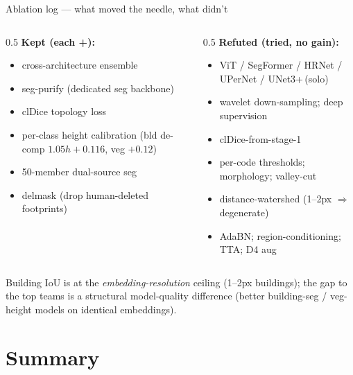 \documentclass[aspectratio=169,11pt]{beamer}
\begin{document}
\begin{frame}{Ablation log --- what moved the needle, what didn't}
  \begin{columns}[T]
    \begin{column}{0.5\textwidth}
      \textcolor{cHead}{\textbf{Kept (each +):}}
      \begin{itemize}\small
        \item cross-architecture ensemble
        \item seg-purify (dedicated seg backbone)
        \item clDice topology loss
        \item per-class height calibration (bld de-comp $1.05h{+}0.116$, veg $+0.12$)
        \item 50-member dual-source seg
        \item delmask (drop human-deleted footprints)
      \end{itemize}
    \end{column}
    \begin{column}{0.5\textwidth}
      \textcolor{cToken}{\textbf{Refuted (tried, no gain):}}
      \begin{itemize}\small
        \item ViT / SegFormer / HRNet / UPerNet / UNet3+\,(solo)
        \item wavelet down-sampling; deep supervision
        \item clDice-from-stage-1
        \item per-code thresholds; morphology; valley-cut
        \item distance-watershed (1--2px $\Rightarrow$ degenerate)
        \item AdaBN; region-conditioning; TTA; D4 aug
      \end{itemize}
    \end{column}
  \end{columns}
  \vspace{0.2em}
  {\footnotesize Building IoU is at the \emph{embedding-resolution} ceiling
   (1--2px buildings); the gap to the top teams is a structural model-quality
   difference (better building-seg / veg-height models on identical embeddings).}
\end{frame}

\section{Summary}
\end{document}
